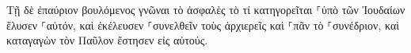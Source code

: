 \documentclass{openreader}
\begin{document}
Τῇ δὲ ἐπαύριον βουλόμενος γνῶναι τὸ ἀσφαλὲς τὸ τί κατηγορεῖται ⸀ὑπὸ τῶν Ἰουδαίων ἔλυσεν ⸀αὐτόν, καὶ ἐκέλευσεν ⸀συνελθεῖν τοὺς ἀρχιερεῖς καὶ ⸀πᾶν τὸ ⸀συνέδριον, καὶ καταγαγὼν τὸν Παῦλον ἔστησεν εἰς αὐτούς. 
\end{document}
